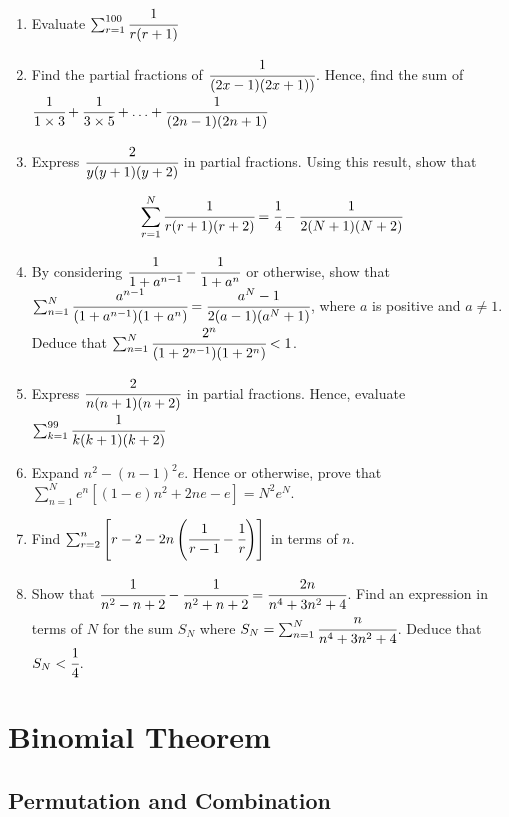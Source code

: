 \documentclass[letterpaper]{article}
\begin{document}
\begin{enumerate}
\item Evaluate $\sum_{r=1}^{100} \cfrac{1}{r(r+1)}$

\item Find the partial fractions of $\cfrac{1}{(2x - 1)(2x + 1))}$. Hence, find the sum of $\cfrac{1}{1 \times 3} + \cfrac{1}{3 \times 5} + \ldots + \cfrac{1}{(2n - 1)(2n + 1)}$

\item Express $\cfrac{2}{y(y+1)(y+2)}$ in partial fractions. Using this result, show that

\begin{align*}
\sum_{r=1}^N \cfrac{1}{r(r+1)(r+2)} = \cfrac{1}{4} - \cfrac{1}{2(N+1)(N+2)}
\end{align*}

\item By considering $\cfrac{1}{1 + a^{n-1}} - \cfrac{1}{1 + a^n}$ or otherwise, show that $\sum_{n=1}^N \cfrac{a^{n-1}}{(1 + a^{n-1})(1 + a^n)} = \cfrac{a^N - 1}{2(a-1)(a^N + 1)}$, where $a$ is positive and $a \neq 1$. Deduce that $\sum_{n=1}^N \cfrac{2^n}{(1 + 2^{n-1})(1 + 2^n)} < 1$.

\item Express $\cfrac{2}{n(n+1)(n+2)}$ in partial fractions. Hence, evaluate $\sum_{k=1}^{99} \cfrac{1}{k(k+1)(k+2)}$

\item Expand $n^2 - (n-1)^2 e$. Hence or otherwise, prove that $\sum_{n=1}^{N} e^n \left[(1-e)n^2 + 2ne - e\right] = N^2 e^N$.

\item Find $\sum_{r=2}^n \left[r - 2 -2n\left(\cfrac{1}{r-1} - \cfrac{1}{r}\right)\right]$ in terms of $n$.

\item Show that $\cfrac{1}{n^2 - n + 2} - \cfrac{1}{n^2 + n + 2} = \cfrac{2n}{n^4 + 3n^2 + 4}$. Find an expression in terms of $N$ for the sum $S_N$ where $S_N = \sum_{n=1}^N \cfrac{n}{n^4 + 3n^2 + 4}$. Deduce that $S_N < \cfrac{1}{4}$.
\end{enumerate}

\section{Binomial Theorem}

\subsection{Permutation and Combination}
\end{document}
